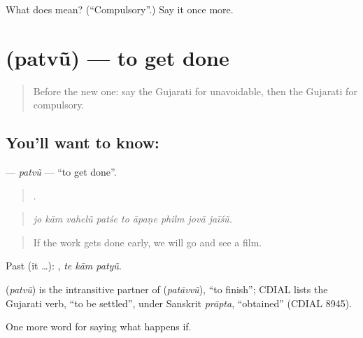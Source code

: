 \begin{tcolorbox}[breakable,colback=teal!4,colframe=teal!35!black,title={Before you move on}]
What does  mean? (\textquotedblleft{}Compulsory\textquotedblright{}.) Say it once more.
\end{tcolorbox}
\section[\texorpdfstring{\gu{પતવું} (patvũ)}{પતવું (patvũ)}]{ (patvũ) — to get done}

\label{lesson:GU-C375-patvu}



\begin{quote}
Before the new one: say the Gujarati for unavoidable, then the Gujarati for compulsory.
\end{quote}

\subsection*{You'll want to know: }
\textbf{} — \emph{patvũ} — \textquotedblleft{}to get done\textquotedblright{}.

\begin{quote}
        .
\end{quote}

\begin{quote}
\emph{jo kām vahelũ patśe to āpaṇe philm jovā jaīśũ.}
\end{quote}

\begin{quote}
If the work gets done early, we will go and see a film.
\end{quote}

Past (it …):   , \emph{te kām patyũ}.

\begin{cousinweb}
\textbf{} (\emph{patvũ}) is the intransitive partner of \textbf{} (\emph{patāvvũ}), \textquotedblleft{}to finish\textquotedblright{}; CDIAL lists the Gujarati verb, \textquotedblleft{}to be settled\textquotedblright{}, under Sanskrit \emph{prāpta}, \textquotedblleft{}obtained\textquotedblright{} (CDIAL 8945).
\end{cousinweb}

\begin{grammarlens}[title={What you've built}]
One more word for saying what happens if.
\end{grammarlens}

